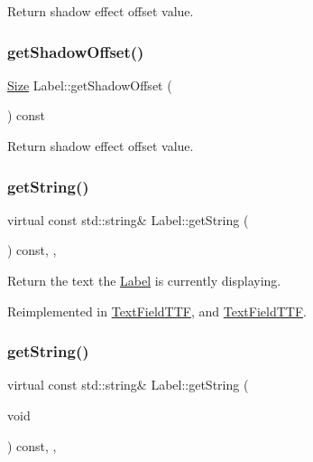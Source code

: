 Return shadow effect offset value. \mbox{\label{classLabel_a46496ccac5e3a936cb0008db68a0e91e}} 
\subsubsection{\texorpdfstring{get\+Shadow\+Offset()}{getShadowOffset()}\hspace{0.1cm}{\footnotesize\ttfamily [2/2]}}
{\footnotesize\ttfamily \hyperlink{classSize}{Size} Label\+::get\+Shadow\+Offset (\begin{DoxyParamCaption}{ }\end{DoxyParamCaption}) const\hspace{0.3cm}{\ttfamily [inline]}}

Return shadow effect offset value. \mbox{\label{classLabel_ab306634d58f4317fd96008a5ee67a7a7}} 
\subsubsection{\texorpdfstring{get\+String()}{getString()}\hspace{0.1cm}{\footnotesize\ttfamily [1/2]}}
{\footnotesize\ttfamily virtual const std\+::string\& Label\+::get\+String (\begin{DoxyParamCaption}{ }\end{DoxyParamCaption}) const\hspace{0.3cm}{\ttfamily [inline]}, {\ttfamily [override]}, {\ttfamily [virtual]}}

Return the text the \hyperlink{classLabel}{Label} is currently displaying. 

Reimplemented in \hyperlink{classTextFieldTTF_a262a78ec2ef963b2fef8fcde2edc0895}{Text\+Field\+T\+TF}, and \hyperlink{classTextFieldTTF_a078bee267d229540d0940ef7f1413240}{Text\+Field\+T\+TF}.

\mbox{\label{classLabel_ab306634d58f4317fd96008a5ee67a7a7}} 
\subsubsection{\texorpdfstring{get\+String()}{getString()}\hspace{0.1cm}{\footnotesize\ttfamily [2/2]}}
{\footnotesize\ttfamily virtual const std\+::string\& Label\+::get\+String (\begin{DoxyParamCaption}\item[{void}]{ }\end{DoxyParamCaption}) const\hspace{0.3cm}{\ttfamily [inline]}, {\ttfamily [override]}, {\ttfamily [virtual]}}

